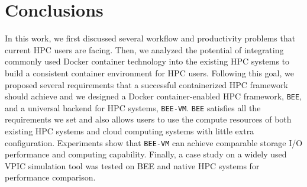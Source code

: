\section{Conclusions}
\label{sec:conclusions}
In this work, we first discussed several workflow and productivity problems that current HPC users are facing. Then, we analyzed the potential of integrating commonly used Docker container technology into the existing HPC systems to build a consistent container environment for HPC users. Following this goal, we proposed several requirements that a successful containerized HPC framework should achieve and we designed a Docker container-enabled HPC framework, \texttt{BEE}, and a universal backend for HPC systems, \texttt{BEE-VM}. \texttt{BEE} satisfies all the requirements we set and also allows users to use the compute resources of both existing HPC systems and cloud computing systems with little extra configuration. Experiments show that \texttt{BEE-VM} can achieve comparable storage I/O performance and computing capability. Finally, a case study on a widely used VPIC simulation tool was tested on BEE and native HPC systems for performance comparison. 
